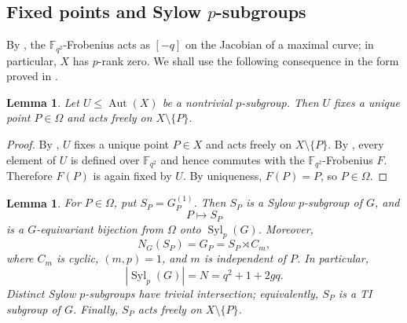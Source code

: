 \documentclass[11pt]{amsart}
\newtheorem{lemma}[theorem]{Lemma}
\theoremstyle{remark}
\newcommand{\F}{\mathbb F}
\newcommand{\Aut}{\operatorname{Aut}}
\newcommand{\Syl}{\operatorname{Syl}}
\begin{document}
\subsection{\texorpdfstring{Fixed points and Sylow $p$-subgroups}{Fixed points and Sylow p-subgroups}}

By \cite[Lemma~1.1]{FGT}, the $\F_{q^2}$-Frobenius acts as $[-q]$ on
the Jacobian of a maximal curve; in particular, $X$ has $p$-rank zero.
We shall use the following consequence in the form proved in
\cite[Proposition~3.12]{GSY}.

\begin{lemma}\label{lem:pgroup-fixed}
Let $U\le\Aut(X)$ be a nontrivial $p$-subgroup.  Then $U$ fixes a unique
point $P\in\Omega$ and acts freely on $X\setminus\{P\}$.
\end{lemma}

\begin{proof}
By \cite[Proposition~3.12]{GSY}, $U$ fixes a unique point $P\in X$ and
acts freely on $X\setminus\{P\}$.  By \cite[Theorem~3.10]{GSY}, every
element of $U$ is defined over $\F_{q^2}$ and hence commutes with the
$\F_{q^2}$-Frobenius $F$.  Therefore $F(P)$ is again fixed by $U$.
By uniqueness, $F(P)=P$, so $P\in\Omega$.
\end{proof}

\begin{lemma}\label{lem:sylowbijection}
For $P\in\Omega$, put $S_P=G_P^{(1)}$.  Then $S_P$ is a Sylow
$p$-subgroup of $G$, and
\[
          P\longmapsto S_P
\]
is a $G$-equivariant bijection from $\Omega$ onto $\Syl_p(G)$.  Moreover,
\begin{equation}\label{eq:stabilizer}
          N_G(S_P)=G_P=S_P\rtimes C_m,
\end{equation}
where $C_m$ is cyclic, $(m,p)=1$, and $m$ is independent of $P$.  In
particular,
\begin{equation}\label{eq:number-sylow}
          |\Syl_p(G)|=N=q^2+1+2gq.
\end{equation}
Distinct Sylow $p$-subgroups have trivial intersection; equivalently,
$S_P$ is a TI subgroup of $G$.  Finally, $S_P$ acts freely on
$X\setminus\{P\}$.
\end{lemma}
\end{document}
